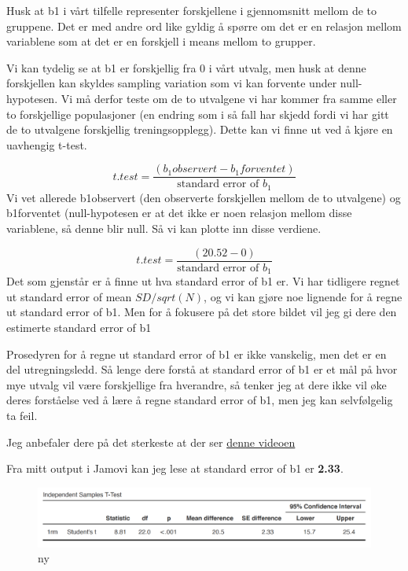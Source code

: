 \documentclass[
]{book}
\begin{document}
Husk at b1 i vårt tilfelle representer forskjellene i gjennomsnitt mellom de to gruppene. Det er med andre ord like gyldig å spørre om det er en relasjon mellom variablene som at det er en forskjell i means mellom to grupper.

Vi kan tydelig se at b1 er forskjellig fra 0 i vårt utvalg, men husk at denne forskjellen kan skyldes sampling variation som vi kan forvente under null-hypotesen. Vi må derfor teste om de to utvalgene vi har kommer fra samme eller to forskjellige populasjoner (en endring som i så fall har skjedd fordi vi har gitt de to utvalgene forskjellig treningsopplegg). Dette kan vi finne ut ved å kjøre en uavhengig t-test.

\[
t.test = \frac{(b_1observert - b_1forventet)}{\text{standard error of } b_1}
\]
Vi vet allerede b1observert (den observerte forskjellen mellom de to utvalgene) og b1forventet (null-hypotesen er at det ikke er noen relasjon mellom disse variablene, så denne blir null. Så vi kan plotte inn disse verdiene.

\[
t.test = \frac{(20.52 - 0)}{\text{standard error of } b_1}
\]
Det som gjenstår er å finne ut hva standard error of b1 er. Vi har tidligere regnet ut standard error of mean \(SD/sqrt(N)\), og vi kan gjøre noe lignende for å regne ut standard error of b1. Men for å fokusere på det store bildet vil jeg gi dere den estimerte standard error of b1

Prosedyren for å regne ut standard error of b1 er ikke vanskelig, men det er en del utregningsledd. Så lenge dere forstå at standard error of b1 er et mål på hvor mye utvalg vil være forskjellige fra hverandre, så tenker jeg at dere ikke vil øke deres forståelse ved å lære å regne standard error of b1, men jeg kan selvfølgelig ta feil.

Jeg anbefaler dere på det sterkeste at der ser \href{https://www.youtube.com/watch?v=3L9ZMdzJyyI}{denne videoen}

Fra mitt output i Jamovi kan jeg lese at standard error of b1 er \textbf{2.33}.

\begin{figure}
\centering
\includegraphics{output.png}
\caption{ny}
\end{figure}
\end{document}
